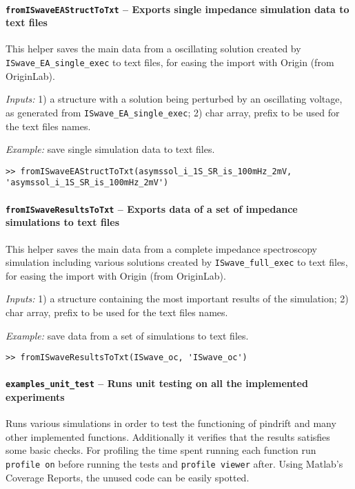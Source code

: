 	\paragraph{\texttt{from\-IS\-waveEA\-Struct\-ToTxt} -- Exports single impedance simulation data to text files}
	This helper saves the main data from a oscillating solution created by \texttt{IS\-wave\_EA\_single\_exec} to text files, for easing the import with Origin (from OriginLab).

	\textit{Inputs:} 1) a structure with a solution being perturbed by an oscillating voltage, as generated from \texttt{IS\-wave\_EA\_single\_exec};
	2) char array, prefix to be used for the text files names.

	\textit{Example:} save single simulation data to text files.
	\begin{lstlisting}[style=Matlab-editor]
>> fromISwaveEAStructToTxt(asymssol_i_1S_SR_is_100mHz_2mV, 'asymssol_i_1S_SR_is_100mHz_2mV')
\end{lstlisting}

	\paragraph{\texttt{from\-IS\-wave\-Results\-ToTxt} -- Exports data of a set of impedance simulations to text files}
	This helper saves the main data from a complete impedance spectroscopy simulation including various solutions created by \texttt{IS\-wave\_full\_exec} to text files, for easing the import with Origin (from OriginLab).

	\textit{Inputs:} 1) a structure containing the most important results of the simulation;
	2) char array, prefix to be used for the text files names.

	\textit{Example:} save data from a set of simulations to text files.
	\begin{lstlisting}[style=Matlab-editor]
>> fromISwaveResultsToTxt(ISwave_oc, 'ISwave_oc')
\end{lstlisting}


	\paragraph{\texttt{examples\_unit\_test} -- Runs unit testing on all the implemented experiments}
	Runs various simulations in order to test the functioning of pindrift and many other implemented functions.
	Additionally it verifies that the results satisfies some basic checks.
	For profiling the time spent running each function run \texttt{profile\- on} before running the tests and \texttt{profile\- viewer} after.
	Using Matlab's Coverage Reports, the unused code can be easily spotted.

